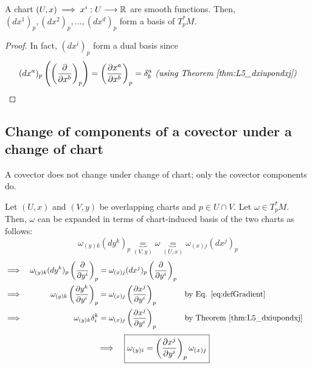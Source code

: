 \begin{theorem}
A chart $(U,x) \implies x^i : U \to \R$ are smooth functions. Then, $(dx^1)_p, (dx^2)_p, \dotsc, (dx^d)_p$ form a basis of $T_p^*M$. 
\end{theorem}
\begin{proof}
In fact, $(dx^i)_p$ form a dual basis since 
\begin{equation}
(dx^a)_p \left(\left(\cibasis{x^b}\right)_p \right) = \left(\cibasis[x^a]{x^b}\right)_p = \delta_b^a \textit{ (using Theorem \ref{thm:L5_dxiupondxj})}
\end{equation}
\end{proof}

\subsection{Change of components of a covector under a change of chart}
 A covector does not change under change of chart; only the covector components do.

Let $(U,x)$ and $(V,y)$ be overlapping charts and $p \in U \cap V$. Let $\omega \in T_p^*M$. Then, $\omega$ can be expanded in terms of chart-induced basis of the two charts as follows:
\begin{equation}\label{eq:L5_CovecExpandedIn2Charts}
\displaystyle\omega_{(y)k}(dy^k)_p \underbrace{=}_{(V,y)} \omega \underbrace{=}_{(U,x)} \omega_{(x)j}(dx^j)_p
\end{equation}
\begin{align*}
  \implies && \displaystyle\omega_{(y)k}(dy^k)_p \left(\cibasis{y^i}\right)_p & = \omega_{(x)j}(dx^j)_p \left(\cibasis{y^i}\right)_p \\
  \implies && \displaystyle\omega_{(y)k} \left(\cibasis[y^k]{y^i}\right)_p & = \omega_{(x)j} \left(\cibasis[x^j]{y^i}\right)_p && \text{by Eq. \ref{eq:defGradient}} \\
  \implies && \displaystyle\omega_{(y)k} \delta^k_i & = \omega_{(x)j} \left(\cibasis[x^j]{y^i}\right)_p && \text{by Theorem \ref{thm:L5_dxiupondxj}}
\end{align*}
\begin{align}
\implies && \boxed{\omega_{(y)i} = \left(\cibasis[x^j]{y^i}\right)_p \omega_{(x)j}} &&
\end{align}

%
